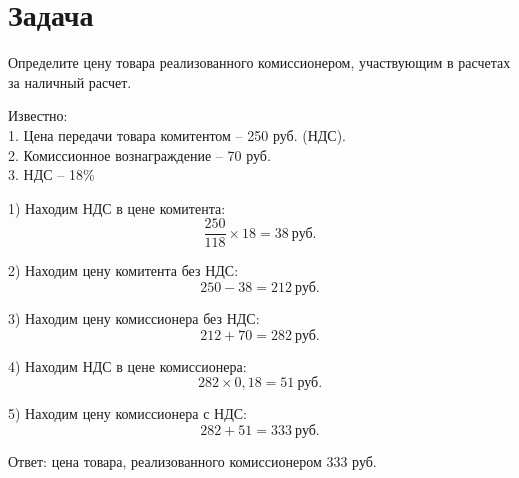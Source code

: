 \section{Задача}
Определите цену товара реализованного комиссионером,
участвующим в расчетах за наличный расчет.

Известно:\\
1. Цена передачи товара комитентом – 250 руб. (НДС).\\
2. Комиссионное вознаграждение – 70 руб.\\
3. НДС – 18\%

1) Находим НДС в цене комитента:
\[ \dfrac{250}{118} \times 18 = 38\  \text{руб.}\] 

2) Находим цену комитента без НДС:
\[ 250 - 38 = 212 \  \text{руб.} \]

3) Находим цену комиссионера без НДС:
\[ 212 + 70 = 282\  \text{руб.} \]

4) Находим НДС в цене комиссионера:
\[ 282 \times 0,18 = 51 \  \text{руб.}  \]

5) Находим цену комиссионера с НДС:
\[ 282 + 51 = 333\  \text{руб.} \]

Ответ: цена товара, реализованного комиссионером 333 руб.